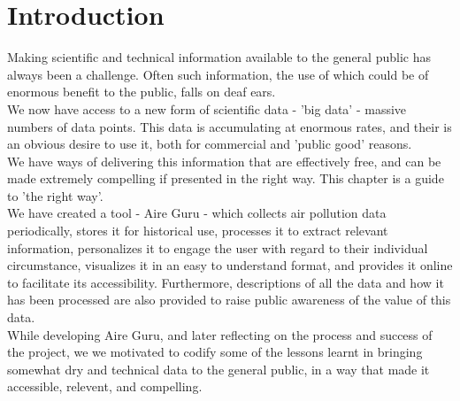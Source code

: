 \newpage
\section{Introduction}

Making scientific and technical information available to the general public has always been a challenge.
Often such information, the use of which could be of enormous benefit to the public, falls on deaf ears.\\

We now have access to a new form of scientific data - 'big data' - massive numbers of data points.
This data is accumulating at enormous rates, and their is an obvious desire to use it, both for
commercial and 'public good' reasons.\\

We have ways of delivering this information that are effectively free, and can be made extremely compelling
if presented in the right way. This chapter is a guide to 'the right way'.\\

We have created a tool - Aire Guru - which collects air pollution data periodically, stores it for historical use, 
processes it to extract relevant information, personalizes it to engage the user with regard to their individual
circumstance, visualizes it in an easy to understand format, and provides it online to facilitate its accessibility. Furthermore,
descriptions of all the data and how it has been processed are also provided to raise public awareness of the value
of this data.\\

While developing Aire Guru, and later reflecting on the process and success of the project, we we motivated to codify
some of the lessons learnt in bringing somewhat dry and technical data to the general public, in a way that made it 
accessible, relevent, and compelling.\\

